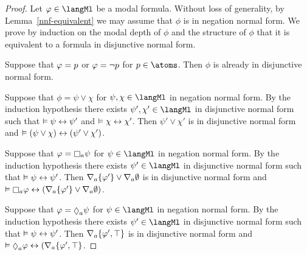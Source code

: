 \begin{proof}
Let $\phi \in \langMl$ be a modal formula.
Without loss of generality, by Lemma~\ref{nnf-equivalent} we may assume that $\phi$ is in negation normal form.
We prove by induction on the modal depth of $\phi$ and the structure of $\phi$ that it is equivalent to a formula in disjunctive normal form.

Suppose that $\varphi = p$ or $\varphi = \lnot p$ for $\atomP \in \atoms$.
Then $\phi$ is already in disjunctive normal form.

Suppose that $\phi = \psi \lor \chi$ for $\psi, \chi \in \langMl$ in negation normal form.
By the induction hypothesis there exists $\psi', \chi' \in \langMl$ in disjunctive normal form such that $\vDash \psi \leftrightarrow \psi'$ and $\vDash \chi \leftrightarrow \chi'$.
Then $\psi' \lor \chi'$ is in disjunctive normal form and $\vDash (\psi \lor \chi) \leftrightarrow (\psi' \lor \chi')$.

Suppose that $\phi = \necessaryA \psi$ for $\psi \in \langMl$ in negation normal form.
By the induction hypothesis there exists $\psi' \in \langMl$ in disjunctive normal form such that $\vDash \psi \leftrightarrow \psi'$.
Then $\nabla_{a} \{\varphi'\} \lor \nabla_{a} \emptyset$ is in disjunctive normal form and $\entails \necessaryA \phi \iff (\coversA \{\phi'\} \lor \coversA \emptyset)$.

Suppose that $\phi = \possibleA \psi$ for $\psi \in \langMl$ in negation normal form.
By the induction hypothesis there exists $\psi' \in \langMl$ in disjunctive normal form such that $\vDash \psi \leftrightarrow \psi'$.
Then $\nabla_{a} \{\varphi', \top\}$ is in disjunctive normal form and $\entails \possibleA \phi \iff (\coversA \{\phi', \top\}$.


\end{proof}
